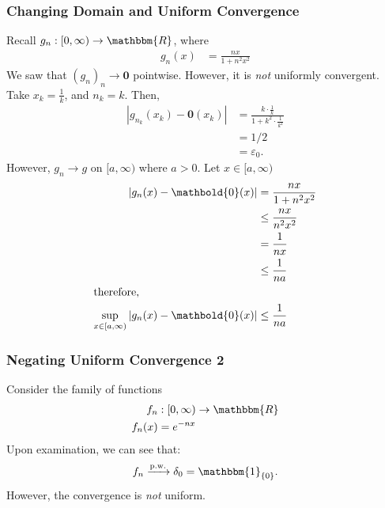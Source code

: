 \documentclass[10pt]{extarticle}
\renewcommand{\mathbf}[1]{\mathbold{#1}}
\newcommand{\R}{\mathbbm{R}}
\begin{document}
    \subsubsection{Changing Domain and Uniform Convergence}%
    Recall $g_n: [0,\infty)\rightarrow \R$, where
    \begin{align*}
      g_n(x) &= \frac{nx}{1 + n^2x^2}
    \end{align*}
    We saw that $(g_n)_n \rightarrow \mathbf{0}$ pointwise. However, it is \textit{not} uniformly convergent. Take $x_k = \frac{1}{k}$, and $n_k = k$. Then,
    \begin{align*}
      \left|g_{n_k}(x_k) - \mathbf{0}(x_k)\right| &= \frac{k\cdot \frac{1}{k}}{1 + k^2\cdot \frac{1}{k^2}}\\
                                                  &= 1/2\\
                                                  &= \varepsilon_0.
    \end{align*}
    However, $g_n \rightarrow g$ on $[a,\infty)$ where $a > 0$. Let $x\in[a,\infty)$
    \begin{align*}
      \left|g_n(x) - \mathbf{0}(x)\right| &= \frac{nx}{1 + n^2x^2}\\
                                          &\leq \frac{nx}{n^2x^2}\\
                                          &= \frac{1}{nx}\\
                                          &\leq \frac{1}{na}\\
                                          \shortintertext{therefore,}
      \sup_{x\in[a,\infty)}\left|g_{n}(x)-\mathbf{0}(x)\right| &\leq \frac{1}{na}
    \end{align*}
    \subsubsection{Negating Uniform Convergence 2}%
    Consider the family of functions
    \begin{align*}
      f_n&: [0,\infty) \rightarrow \R\\
      f_n(x) &= e^{-nx}
    \end{align*}
    Upon examination, we can see that:
    \begin{align*}
      f_n \xrightarrow{\text{p.w.}} \delta_0 = \mathbbm{1}_{\{0\}}.
    \end{align*}
    However, the convergence is \textit{not} uniform.\\
\end{document}
